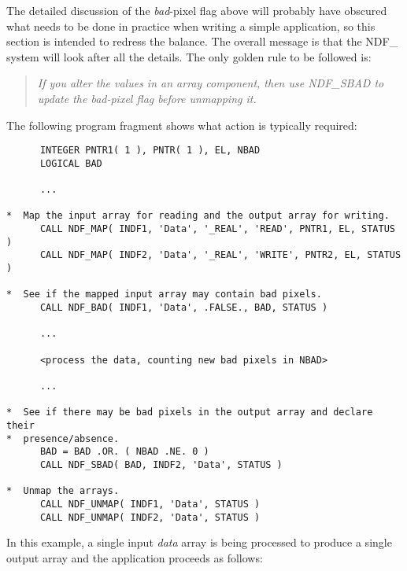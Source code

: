 \documentclass[twoside,11pt]{article}
\newcommand{\htmlref}[2]{#1}
\newcommand{\st}[1]{{\em{#1}}}
\begin{document}
The detailed discussion of the \st{bad\/}-pixel flag above will probably have
obscured what needs to be done in practice when writing a simple application,
so this section is intended to redress the balance. 
The overall message is that the NDF\_ system will look after all 
the details.
The only golden rule to be followed is:

\begin{quote}
\begin{center}
\st{If you alter the values in an array component, then use \htmlref{NDF\_SBAD}{NDF_SBAD} to 
update the bad-pixel flag before unmapping it.}
\end{center}
\end{quote}

The following program fragment shows what action is typically required:

\small
\begin{verbatim}
      INTEGER PNTR1( 1 ), PNTR( 1 ), EL, NBAD
      LOGICAL BAD

      ...

*  Map the input array for reading and the output array for writing.
      CALL NDF_MAP( INDF1, 'Data', '_REAL', 'READ', PNTR1, EL, STATUS )
      CALL NDF_MAP( INDF2, 'Data', '_REAL', 'WRITE', PNTR2, EL, STATUS )

*  See if the mapped input array may contain bad pixels.
      CALL NDF_BAD( INDF1, 'Data', .FALSE., BAD, STATUS )

      ...

      <process the data, counting new bad pixels in NBAD>

      ...

*  See if there may be bad pixels in the output array and declare their
*  presence/absence.
      BAD = BAD .OR. ( NBAD .NE. 0 )
      CALL NDF_SBAD( BAD, INDF2, 'Data', STATUS )

*  Unmap the arrays.
      CALL NDF_UNMAP( INDF1, 'Data', STATUS )
      CALL NDF_UNMAP( INDF2, 'Data', STATUS )
\end{verbatim}
\normalsize

In this example, a single input \st{data\/} array is being processed to produce a
single output array and the application proceeds as follows:
\end{document}
